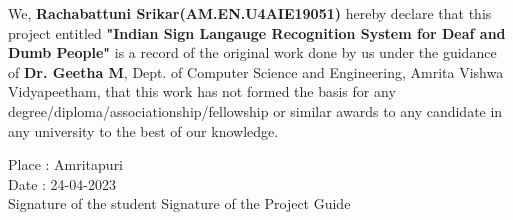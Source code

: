 \documentclass[oneside,12pt]{Classes/CUEDthesisPSnPDF}
\begin{document}
\vspace{1pt}

We, \textbf{Rachabattuni Srikar(AM.EN.U4AIE19051)} hereby declare that this project entitled \textbf{"Indian Sign Langauge Recognition System for Deaf and Dumb People"} is a record of the original work done by us under the guidance of \textbf{Dr. Geetha M}, Dept. of Computer Science and Engineering, Amrita Vishwa Vidyapeetham, that this work has not formed the basis for any degree/diploma/associationship/fellowship or similar awards to any candidate in any university to the best of our knowledge.\\

\vspace{60pt}

\begin{flushleft}

	Place	:	Amritapuri\\[1ex]

	Date	:	24-04-2023\\[15ex]

	Signature of the student \hspace{90pt}	Signature of the Project Guide\\

\end{flushleft}

\setcounter{secnumdepth}{3}

\setcounter{tocdepth}{3}

\frontmatter %



\end{document}
